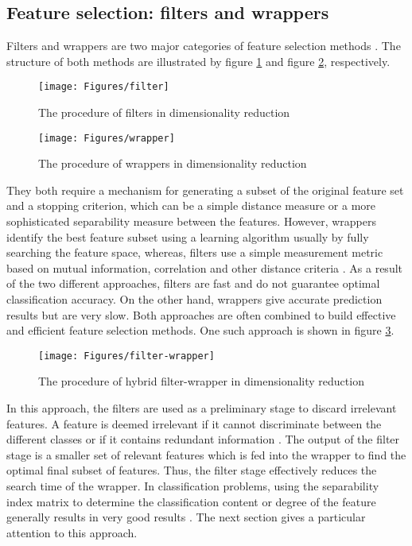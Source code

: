 \subsection{Feature selection: filters and wrappers}
Filters and wrappers are two major categories of feature selection methods \cite{effi2016} \cite{newh2016} \cite{hybr2011} \cite{sima2013}. %
The structure of both methods are illustrated by figure \ref{fig:filt} and figure \ref{fig:wrap}, respectively.
\begin{figure}[ht!]
	\centering
	\texttt{[image: Figures/filter]}
	\caption{The procedure of filters in dimensionality reduction}{\cite{hybr2011}}
	\label{fig:filt}
\end{figure}
\begin{figure}[ht!]
	\centering
	\texttt{[image: Figures/wrapper]}
	\caption{The procedure of wrappers in dimensionality reduction}{\cite{hybr2011}}
	\label{fig:wrap}
\end{figure}
They both require a mechanism for generating a subset of the original feature set and a stopping criterion, which can be a simple distance measure or a more sophisticated separability measure between the features. However, wrappers identify the best feature subset using a learning algorithm usually by fully searching the feature space, whereas, filters use a simple measurement metric based on mutual information, correlation and other distance criteria \cite{hybr2011} \cite{sima2013}.
As a result of the two different approaches, filters are fast and do not guarantee optimal classification accuracy. On the other hand, wrappers give accurate prediction results but are very slow.
Both approaches are often combined to build effective and efficient feature selection methods. One such approach is shown in figure \ref{fig:filt-wrap}. 
\begin{figure}[ht!]
	\centering
	\texttt{[image: Figures/filter-wrapper]}
	\caption{The procedure of hybrid filter-wrapper in dimensionality reduction}{\cite{hybr2011}}
	\label{fig:filt-wrap}
\end{figure}
In this approach, the filters are used as a preliminary stage to discard irrelevant features. A feature is deemed irrelevant if it cannot discriminate between the different classes or if it contains redundant information \cite{hybr2011}.
The output of the filter stage is a smaller set of relevant features which is fed into the wrapper to find the optimal final subset of features. Thus, the filter stage effectively reduces the search time of the wrapper. 
In classification problems, using the separability index matrix to determine the classification content or degree of the feature generally results in very good results \cite{sima2013}. 
The next section gives a particular attention to this approach.

